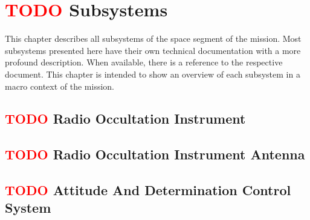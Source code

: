 %
%
%
%
%

%
%
%
%
%
%

\chapter{ \textcolor{red}{TODO} Subsystems} \label{ch:subsystems}



This chapter describes all subsystems of the space segment of the mission. Most subsystems presented here have their own technical documentation with a more profound description. When available, there is a reference to the respective document. This chapter is intended to show an overview of each subsystem in a macro context of the mission.

\section{ \textcolor{red}{TODO} Radio Occultation Instrument}


\section{ \textcolor{red}{TODO} Radio Occultation Instrument Antenna}


\section{ \textcolor{red}{TODO} Attitude And Determination Control System}

